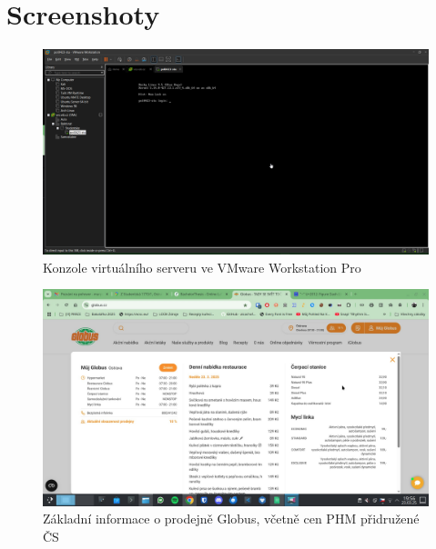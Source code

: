 \chapter{Screenshoty}

\begin{figure}
    \centering
    \includegraphics[width=\textwidth]{Figures/vmware_console.png}
    \caption{Konzole virtuálního serveru ve VMware Workstation Pro}
    \label{fig:vmware-workstation-pro}
\end{figure}

\begin{figure}
    \centering
    \includegraphics[width=\textwidth]{Figures/globus_vyber.jpg}
    \caption{Základní informace o prodejně Globus, včetně cen PHM
        přidružené ČS}
    \label{fig:globus-cs}
\end{figure}
